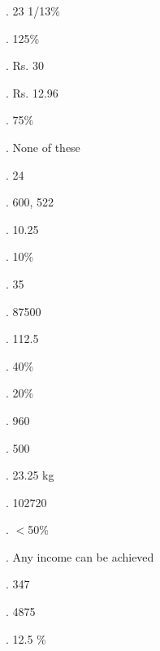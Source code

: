\documentclass{article}
\begin{document}
 




\noindent 

\noindent 

.   23 1/13\%

\noindent 

.   125\%

\noindent 

.   Rs. 30

\noindent 

.   Rs. 12.96

\noindent 

.   75\%

\noindent 

.   None of these

\noindent 

.   24

\noindent 

.   600, 522

\noindent 

.   10.25

\noindent 

. 10\%

\noindent 

. 35

\noindent 

. 87500

\noindent 

. 112.5

\noindent 

. 40\%

\noindent 

. 20\%

\noindent 

. 960

\noindent 

. 500

\noindent 

. 23.25 kg

\noindent 

. 102720

\noindent 

. $\mathrm{<}$50\%

\noindent 

. Any income can be achieved

\noindent 

. 347

\noindent 

. 4875

\noindent 

. 12.5 \%
\end{document}
